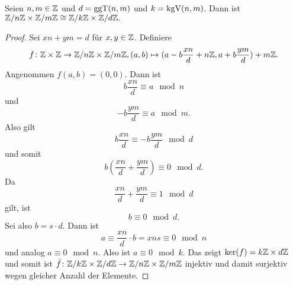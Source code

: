 \begin{Lemma}\label{Lem:ChinRest1}
    Seien \(n,m\in\mathbb{Z}\) und \(d=\operatorname{ggT}(n,m)\) und \(k=\operatorname{kgV}(n,m)\).
    Dann ist \(\mathbb{Z}/n\mathbb{Z}\times\mathbb{Z}/m\mathbb{Z}\cong \mathbb{Z}/k\mathbb{Z}\times\mathbb{Z}/d\mathbb{Z}.\)
\end{Lemma}
\begin{proof}
    Sei \(xn+ym=d\) für \(x,y\in \mathbb{Z}\).
    Definiere \[f\colon \mathbb{Z}\times \mathbb{Z}\to\mathbb{Z}/n\mathbb{Z}\times\mathbb{Z}/m\mathbb{Z}, (a,b)\mapsto (a-b\frac{xn}{d}+n\mathbb{Z},a+b\frac{ym}{d})+m\mathbb{Z}.\]
    Angenommen \(f(a,b)=(0,0)\). Dann ist \[b\frac{xn}{d}\equiv a \mod n\] und \[-b\frac{ym}{d}\equiv a\mod m.\] Also gilt \[b\frac{xn}{d}\equiv -b\frac{ym}{d} \mod d\] und somit \[b(\frac{xn}{d}+\frac{ym}{d})\equiv 0 \mod d.\] Da \[\frac{xn}{d}+\frac{ym}{d}\equiv 1\mod d\] gilt, ist \[b\equiv 0 \mod d.\] Sei also \(b=s\cdot d\). Dann ist \[a\equiv \frac{xn}{d}\cdot b=xns\equiv 0\mod n\] und analog \(a\equiv 0 \mod n\). Also ist \(a\equiv 0\mod k\). Das zeigt \(\ker(f)=k\mathbb{Z}\times d\mathbb{Z}\) und somit ist \(\bar f\colon \mathbb{Z}/k\mathbb{Z}\times \mathbb{Z}/d\mathbb{Z}\to \mathbb{Z}/n\mathbb{Z}\times \mathbb{Z}/m\mathbb{Z}\) injektiv und damit surjektiv wegen gleicher Anzahl der Elemente.
\end{proof}

